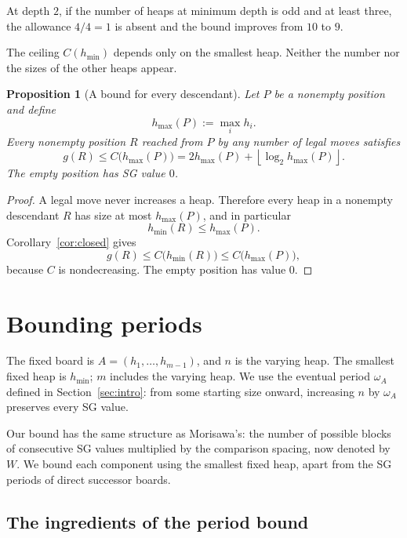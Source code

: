 \documentclass[10pt,a4paper]{article}
\newtheorem{proposition}[theorem]{Proposition}
\begin{document}
At depth $2$, if the number of heaps at minimum depth is odd
and at least three, the allowance $4/4=1$ is absent and the
bound improves from $10$ to $9$.

The ceiling $C(h_{\min})$ depends only on the smallest heap.
Neither the number nor the sizes of the other heaps appear.

\begin{proposition}[A bound for every descendant]
\label{prop:descendantbound}
Let $P$ be a nonempty position and define
\[
 h_{\max}(P):=\max_i h_i.
\]
Every nonempty position $R$ reached from $P$ by any number of
legal moves satisfies
\begin{equation}
 \boxed{
 g(R)\le C\bigl(h_{\max}(P)\bigr)
 =
 2h_{\max}(P)
 +\left\lfloor\log_2 h_{\max}(P)\right\rfloor.
 }
 \label{eq:descendantbound}
\end{equation}
The empty position has SG value $0$.
\end{proposition}

\begin{proof}
A legal move never increases a heap. Therefore every heap in a
nonempty descendant $R$ has size at most $h_{\max}(P)$, and in
particular
\[
 h_{\min}(R)\le h_{\max}(P).
\]
Corollary~\ref{cor:closed} gives
\[
 g(R)\le C\bigl(h_{\min}(R)\bigr)
 \le C\bigl(h_{\max}(P)\bigr),
\]
because $C$ is nondecreasing. The empty position has value $0$.
\end{proof}


\section{Bounding periods}
\label{sec:periods}

The fixed board is $A=(h_1,\ldots,h_{m-1})$, and $n$ is the
varying heap. The smallest fixed heap is $h_{\min}$; $m$ includes
the varying heap. We use the eventual period $\omega_A$ defined
in Section~\ref{sec:intro}: from some starting size onward,
increasing $n$ by $\omega_A$ preserves every SG value.

Our bound has the same structure as Morisawa's: the number of
possible blocks of consecutive SG values multiplied by the
comparison spacing, now denoted by $W$. We bound each component
using the smallest fixed heap, apart from the SG periods of
direct successor boards.

\subsection{The ingredients of the period bound}
\end{document}
